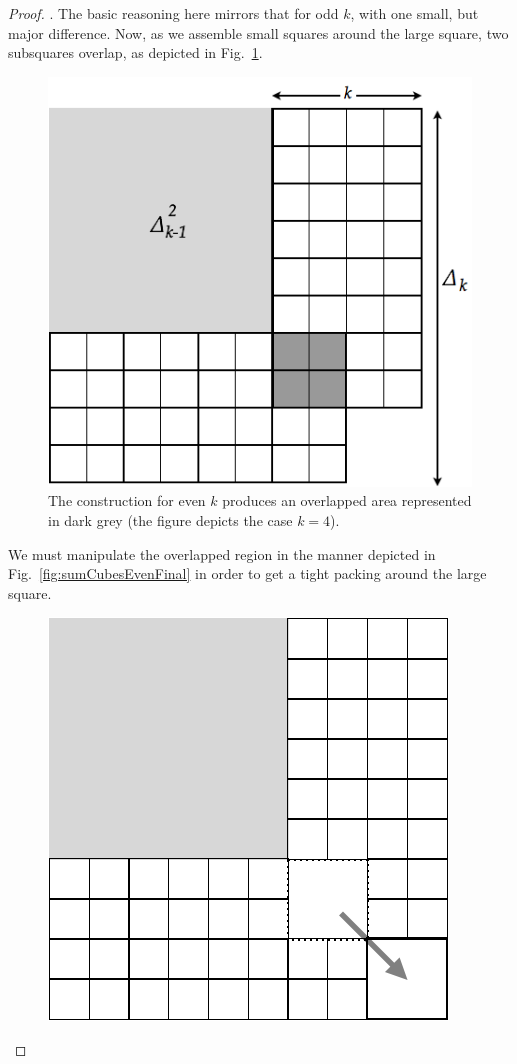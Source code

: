 \begin{proof}
\medskip

.
The basic reasoning here mirrors that for odd $k$, with one small, but major difference.   Now,  as we assemble small squares around the large square, two subsquares overlap, as depicted in Fig.~\ref{fig:sumCubesEven}.
\begin{figure}[hbt]
\begin{center}
       \includegraphics[scale=0.35]{FiguresMaths/SumCubesEven}
\caption{The construction for even $k$ produces  an overlapped area represented in dark grey (the figure depicts the case $k=4$).}
       \label{fig:sumCubesEven}
\end{center}
\end{figure}
We must manipulate the overlapped region in the manner depicted in Fig.~\ref{fig:sumCubesEvenFinal} in order to get a tight packing around the large square.
\begin{figure}[hbt]
\begin{center}
       \includegraphics[scale=0.35]{FiguresMaths/SumCubesEvenFinal}

\end{center}
\end{figure}
\end{proof}
